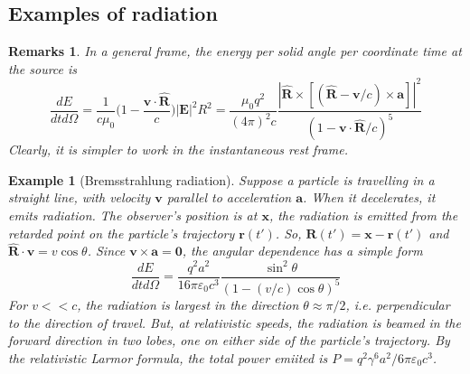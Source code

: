 \documentclass[a4paper]{article}
\newtheorem{remarks}{Remarks}[section]
\newtheorem{eg}{Example}[section]
\theoremstyle{new}
\begin{document}
\subsection{Examples of radiation}
\begin{remarks}
In a general frame, the energy per solid angle per coordinate time at the source is
$$\frac{dE}{dtd\Omega}=\frac{1}{c\mu_0}\bigg(1-\frac{\mathbf{v}\cdot\mathbf{\hat{R}}}{c}\bigg)|\mathbf{E}|^2R^2=\frac{\mu_0q^2}{(4\pi)^2c}\frac{|\mathbf{\hat{R}}\times[(\mathbf{\hat{R}}-\mathbf{v}/c)\times\mathbf{a}]|^2}{(1-\mathbf{v}\cdot\mathbf{\hat{R}}/c)^5}$$
Clearly, it is simpler to work in the instantaneous rest frame.
\end{remarks}
\begin{eg}[Bremsstrahlung radiation]
Suppose a particle is travelling in a straight line, with velocity $\mathbf{v}$ parallel to acceleration $\mathbf{a}$. When it decelerates, it emits radiation. The observer's position is at $\mathbf{x}$, the radiation is emitted from the retarded point on the particle's trajectory $\mathbf{r}(t')$. So, $\mathbf{R}(t')=\mathbf{x}-\mathbf{r}(t')$ and $\mathbf{\hat{R}}\cdot\mathbf{v}=v\cos\theta$. Since $\mathbf{v}\times\mathbf{a}=\boldsymbol{0}$, the angular dependence has a simple form
$$\frac{dE}{dtd\Omega}=\frac{q^2a^2}{16\pi\varepsilon_0c^3}\frac{\sin^2\theta}{(1-(v/c)\cos\theta)^5}$$
For $v<<c$, the radiation is largest in the direction $\theta\approx\pi/2$, i.e. perpendicular to the direction of travel. But, at relativistic speeds, the radiation is beamed in the forward direction in two lobes, one on either side of the particle's trajectory. By the relativistic Larmor formula, the total power emiited is $P=q^2\gamma^6a^2/6\pi\varepsilon_0c^3$.
\end{eg}
\end{document}

